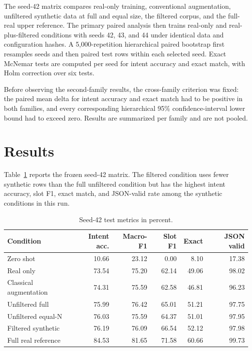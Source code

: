 \documentclass[11pt]{article}
\begin{document}
The seed-42 matrix compares real-only training, conventional augmentation,
unfiltered synthetic data at full and equal size, the filtered corpus, and the
full-real upper reference.  The primary paired analysis then trains real-only and
real-plus-filtered conditions with seeds 42, 43, and 44 under identical data and
configuration hashes.  A 5,000-repetition hierarchical paired bootstrap first
resamples seeds and then paired test rows within each selected seed.  Exact
McNemar tests are computed per seed for intent accuracy and exact match, with
Holm correction over six tests.

Before observing the second-family results, the cross-family criterion was fixed:
the paired mean delta for intent accuracy and exact match had to be positive in
both families, and every corresponding hierarchical 95\% confidence-interval
lower bound had to exceed zero.  Results are summarized per family and are not
pooled.

\section{Results}
Table~\ref{tab:primary} reports the frozen seed-42 matrix.  The filtered condition
uses fewer synthetic rows than the full unfiltered condition but has the highest
intent accuracy, slot F1, exact match, and JSON-valid rate among the synthetic
conditions in this run.

\begin{table}[ht]
\centering
\small
\begin{tabular}{lrrrrr}
\toprule
Condition & Intent acc. & Macro-F1 & Slot F1 & Exact & JSON valid \\
\midrule
Zero shot & 10.66 & 23.12 & 0.00 & 8.10 & 17.38 \\
Real only & 73.54 & 75.20 & 62.14 & 49.06 & 98.02 \\
Classical augmentation & 74.31 & 75.59 & 62.58 & 46.81 & 96.23 \\
Unfiltered full & 75.99 & 76.42 & 65.01 & 51.21 & 97.75 \\
Unfiltered equal-N & 76.03 & 75.59 & 64.37 & 51.01 & 97.95 \\
Filtered synthetic & 76.19 & 76.09 & 66.54 & 52.12 & 97.98 \\
Full real reference & 84.53 & 81.65 & 71.58 & 60.66 & 99.73 \\
\bottomrule
\end{tabular}
\caption{Seed-42 test metrics in percent.}
\label{tab:primary}
\end{table}
\end{document}
